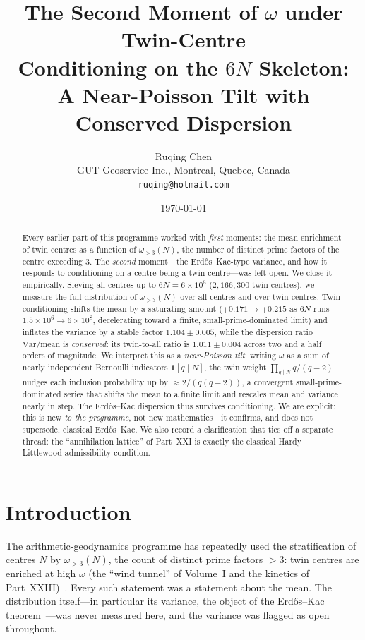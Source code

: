 \documentclass[11pt,a4paper]{article}
\title{\Large \textbf{The Second Moment of $\omega$ under Twin-Centre\\
Conditioning on the $6N$ Skeleton:\\ A Near-Poisson Tilt with Conserved Dispersion}}
\author{Ruqing Chen\\
\small GUT Geoservice Inc., Montreal, Quebec, Canada\\
\small \texttt{ruqing@hotmail.com}}
\date{\today}
\theoremstyle{remark}\newtheorem{remark}{Remark}
\begin{document}
\maketitle

\begin{abstract}
Every earlier part of this programme worked with \emph{first} moments: the mean
enrichment of twin centres as a function of $\omega_{>3}(N)$, the number of distinct
prime factors of the centre exceeding $3$. The \emph{second} moment---the
Erd\H{o}s--Kac-type variance, and how it responds to conditioning on a centre being
a twin centre---was left open. We close it empirically. Sieving all centres up to
$6N=6\times10^8$ ($2{,}166{,}300$ twin centres), we measure the full distribution of
$\omega_{>3}(N)$ over all centres and over twin centres. Twin-conditioning shifts the
mean by a saturating amount ($+0.171\to+0.215$ as $6N$ runs $1.5\times10^6\to
6\times10^8$, decelerating toward a finite, small-prime-dominated limit) and
inflates the variance by a stable factor $1.104\pm0.005$, while the dispersion ratio
$\mathrm{Var}/\mathrm{mean}$ is \emph{conserved}: its twin-to-all ratio is
$1.011\pm0.004$ across two and a half orders of magnitude. We interpret this as a
\emph{near-Poisson tilt}: writing $\omega$ as a sum of nearly independent
Bernoulli indicators $\mathbf 1[q\mid N]$, the twin weight $\prod_{q\mid N}q/(q-2)$
nudges each inclusion probability up by $\approx2/(q(q-2))$, a convergent
small-prime-dominated series that shifts the mean to a finite limit and rescales
mean and variance nearly in step. The Erd\H{o}s--Kac dispersion thus survives
conditioning. We are explicit: this is new \emph{to the programme}, not new
mathematics---it confirms, and does not supersede, classical Erd\H{o}s--Kac. We also
record a clarification that ties off a separate thread: the ``annihilation lattice''
of Part~XXI is exactly the classical Hardy--Littlewood admissibility condition.
\end{abstract}

\section{Introduction}
The arithmetic-geodynamics programme has repeatedly used the stratification of
centres $N$ by $\omega_{>3}(N)$, the count of distinct prime factors $>3$: twin
centres are enriched at high $\omega$ (the ``wind tunnel'' of Volume~I and the
kinetics of Part~XXIII)~\cite{ChenXVII,ChenXXIII}. Every such statement was a
statement about the mean. The distribution itself---in particular its variance, the
object of the Erd\H{o}s--Kac theorem~\cite{ErdosKac}---was never measured here, and
the variance was flagged as open throughout.
\end{document}
